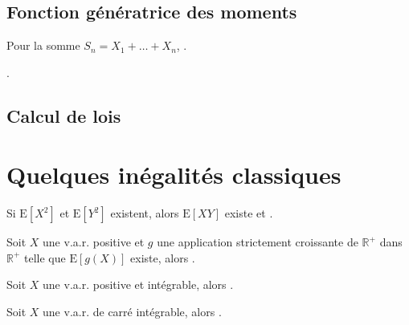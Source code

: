 \documentclass[10pt, french]{report}
\begin{document}
\begin{multicols*}{2}
\columnbreak
\section{Fonction génératrice des moments}
Pour la somme $S_{n} = X_{1} + \dots + X_{n}$, .

.



\columnbreak
\section{Calcul de lois}



\newpage
\chapter{Quelques inégalités classiques}
\begin{definitionNOHFILL}
Si $\text{E}[X^{2}]$ et $\text{E}[Y^{2}]$ existent, alors $\text{E}[XY]$ existe et .
\end{definitionNOHFILL}

\begin{definitionNOHFILL}
Soit $X$ une v.a.r. positive et $g$ une application strictement croissante de $\mathbb{R}^{+}$ dans $\mathbb{R}^{+}$ telle que $\text{E}[g(X)]$ existe, alors  .
\end{definitionNOHFILL}

\begin{definitionNOHFILL}
Soit $X$ une v.a.r. positive et intégrable, alors  .
\end{definitionNOHFILL}

\begin{definitionNOHFILL}
Soit $X$ une v.a.r. de carré intégrable, alors  .
\end{definitionNOHFILL}


\end{multicols*}
\end{document}
